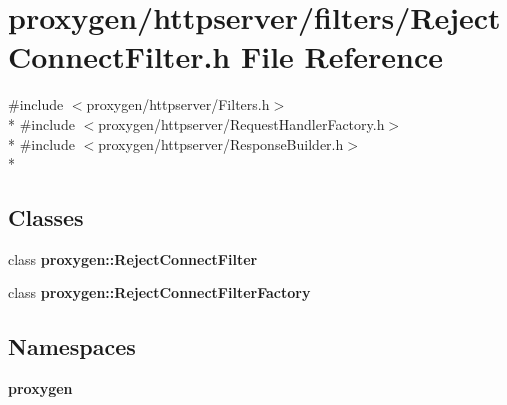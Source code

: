 \section{proxygen/httpserver/filters/\+Reject\+Connect\+Filter.h File Reference}
\label{RejectConnectFilter_8h}
{\ttfamily \#include $<$proxygen/httpserver/\+Filters.\+h$>$}\\*
{\ttfamily \#include $<$proxygen/httpserver/\+Request\+Handler\+Factory.\+h$>$}\\*
{\ttfamily \#include $<$proxygen/httpserver/\+Response\+Builder.\+h$>$}\\*
\subsection*{Classes}
\begin{DoxyCompactItemize}
\item 
class {\bf proxygen\+::\+Reject\+Connect\+Filter}
\item 
class {\bf proxygen\+::\+Reject\+Connect\+Filter\+Factory}
\end{DoxyCompactItemize}
\subsection*{Namespaces}
\begin{DoxyCompactItemize}
\item 
 {\bf proxygen}
\end{DoxyCompactItemize}

